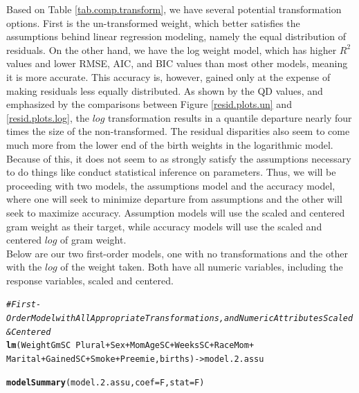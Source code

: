 \documentclass{article}\usepackage[]{graphicx}\usepackage[]{xcolor}
\makeatletter
\newcommand{\hlcom}[1]{\textcolor[rgb]{0.678,0.584,0.686}{\textit{#1}}}%
\newcommand{\hlopt}[1]{\textcolor[rgb]{0,0,0}{#1}}%
\newcommand{\hlstd}[1]{\textcolor[rgb]{0.345,0.345,0.345}{#1}}%
\newcommand{\hlkwb}[1]{\textcolor[rgb]{0.69,0.353,0.396}{#1}}%
\newcommand{\hlkwc}[1]{\textcolor[rgb]{0.333,0.667,0.333}{#1}}%
\newcommand{\hlkwd}[1]{\textcolor[rgb]{0.737,0.353,0.396}{\textbf{#1}}}%
\newenvironment{kframe}{%
 \def\at@end@of@kframe{}%
 \ifinner\ifhmode%
  \def\at@end@of@kframe{\end{minipage}}%
  \begin{minipage}{\columnwidth}%
 \fi\fi%
 \def\FrameCommand##1{\hskip\@totalleftmargin \hskip-\fboxsep
 \colorbox{shadecolor}{##1}\hskip-\fboxsep
     \hskip-\linewidth \hskip-\@totalleftmargin \hskip\columnwidth}%
 \MakeFramed {\advance\hsize-\width
   \@totalleftmargin\z@ \linewidth\hsize
   \@setminipage}}%
 {\par\unskip\endMakeFramed%
 \at@end@of@kframe}
\newenvironment{knitrout}{}{} %
\makeatother
\begin{document}
Based on Table \ref{tab.comp.transform}, we have several potential transformation options. First is the un-transformed weight, which better satisfies the assumptions behind linear regression modeling, namely the equal
distribution of residuals. On the other hand, we have the log weight model, which has higher $R^2$ values and lower RMSE, AIC, and BIC values than most other models, meaning it is more accurate. This accuracy is, however, gained only at the expense of making residuals less equally distributed. As shown by the QD values, and emphasized by the comparisons between Figure \ref{resid.plots.un} and \ref{resid.plots.log}, the $log$ transformation results in a quantile departure nearly four times the size of the non-transformed. The residual disparities also seem to come much more from the lower end of the birth weights in the logarithmic model. Because of this, it does not seem to as strongly satisfy the assumptions necessary to do things like conduct statistical inference on parameters. Thus, we will be proceeding with two models, the assumptions model and the accuracy model, where one will seek to minimize departure from assumptions and the other will seek to maximize accuracy. Assumption models will use the scaled and centered gram weight as their target, while accuracy models will use the scaled and centered $log$ of gram weight.\\

Below are our two first-order models, one with no transformations and the other with the $log$ of the weight taken. Both have all numeric variables, including the response variables, scaled and centered.

\begin{knitrout}
\color{fgcolor}\begin{kframe}
\begin{alltt}
\hlcom{#First-Order Model with All Appropriate Transformations, and Numeric Attributes Scaled & Centered}
\hlkwd{lm}\hlstd{(WeightGmSC} \hlopt{~} \hlstd{Plural} \hlopt{+} \hlstd{Sex} \hlopt{+} \hlstd{MomAgeSC} \hlopt{+} \hlstd{WeeksSC} \hlopt{+} \hlstd{RaceMom} \hlopt{+}
     \hlstd{Marital} \hlopt{+} \hlstd{GainedSC} \hlopt{+} \hlstd{Smoke} \hlopt{+} \hlstd{Preemie, births)} \hlkwb{->} \hlstd{model.2.assu}

\hlkwd{modelSummary}\hlstd{(model.2.assu,} \hlkwc{coef}\hlstd{=F,} \hlkwc{stat}\hlstd{=F)}
\end{alltt}
\end{kframe}
\end{knitrout}
\end{document}
